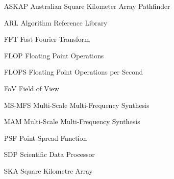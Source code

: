 \documentclass[11pt,a4paper,variablewidth]{article}
\begin{document}
\tccfrontpage

\sdptableofcontents

\sdplistofabbreviations
\begin{basedescript}{\desclabelstyle{\pushlabel}\desclabelwidth{6em}}
    \item[ASKAP] Australian Square Kilometer Array Pathfinder\vspace{-0.2cm}
    \item[ARL] Algorithm Reference Library\vspace{-0.2cm}
    \item[FFT] Fast Fourier Transform\vspace{-0.2cm}
    \item[FLOP] Floating Point Operations \vspace{-0.2cm}
    \item[FLOPS] Floating Point Operations per Second \vspace{-0.2cm}
    \item[FoV] Field of View\vspace{-0.2cm}
    \item[MS-MFS] Multi-Scale Multi-Frequency Synthesis\vspace{-0.2cm}
    \item[MAM] Multi-Scale Multi-Frequency Synthesis\vspace{-0.2cm}
    \item[PSF] Point Spread Function \vspace{-0.2cm}
    \item[SDP] Scientific Data Processor\vspace{-0.2cm}
    \item[SKA] Square Kilometre Array\vspace{-0.2cm}
\end{basedescript} 

\newcommand{\nuno}{{\left(\frac{\nu}{\nu_0}\right)}}
\newcommand{\dnuno}{{\left(\frac{\nu-\nu_0}{\nu_0}\right)}}

\newcommand{\dg}{^\dag}
\newcommand{\X}{\vec{x}}
\newcommand{\Xd}{\vec{{x}^\dag}}
\newcommand{\B}{\vec{b}}
\newcommand{\Bd}{\vec{b^\dag}}
\newcommand{\V}{\vec{V}}
\newcommand{\Vd}{\vec{V^\dag}}
\newcommand{\A}{{\tens{A}{}}}
\newcommand{\Ad}{{\tens{A^\dag}{}}}
\newcommand{\F}{{\tens{F}{s}}}
\newcommand{\Fd}{{\tens{F^\dag}{}}}
\newcommand{\He}{{\tens{H}{}}}
\newcommand{\Sa}{{\tens{S}{}}}
\newcommand{\Sd}{{\tens{S^\dag}{}}}
\newcommand{\Sna}{\tens{{S_{\nu}}{}}}
\newcommand{\Snd}{\tens{{S_{\nu}^\dag}{}}}
\newcommand{\T}{{\tens{T}{}}}
\newcommand{\W}{{\tens{W}{}}}
\newcommand{\Wd}{{\tens{W^\dag}{}}}
\newcommand{\Pb}{{\vec{P}}}
\end{document}

